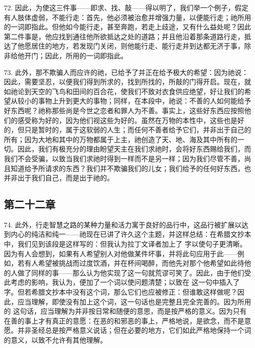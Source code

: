 72. 因此，为使这三件事——即求、找、敲——得以明了，我们举一个例子，假定有人肢体虚弱，不能行走：首先，他必须被治愈并增强力量，以便能行走；祂所用的一词即指此。但他如今能行走，甚至奔跑，若走上歧途，又有什么益处呢？因此第二件事是，他应找到通往他所欲抵达之处的道路；并且他沿着那条道路行走，抵达了他愿居住的地方，若发现门关闭，则他能行走、能行走并到达都无济于事，除非给他开门；因此，所用的一词即指此。\par

73. 此外，那不欺骗人而应许的祂，已给予了并正在给予极大的希望：因为祂说：因此，需要坚忍，以便我们得到所求的，找到所找的，所敲的门得开启。现在，就如祂论到天空的飞鸟和田间的百合花，使我们不致对衣食供应绝望，好让我们的希望从较小的事物上升到更大的事物；同样，在本段中，祂说：不善的人如何能给予好东西呢？祂称那些尚是今世之恋者和罪人为不善。事实上，这些好东西应按照他们的感受称为好的，因为他们视这些为好的。虽然在万物的本性中，这些也是好的，但只是暂时的，属于这软弱的人生；而任何不善者给予它们，并非出于自己的所有；因为大地和其中的万物都属于上主，祂创造了天、地、海及其中所有的一切。因此，我们有极充分的理由盼望天主在我们求祂时，会将好东西赐给我们，而我们不会受骗，以致当我们求祂时得到一样而不是另一样；因为我们尽管不善，尚且知道给予所请求的东西？我们并不欺骗我们的儿女；我们给予的任何好东西，也并非出于我们自己，而是出于祂的。\par


\subsection{第二十二章}

74. 此外，行走智慧之路的某种力量和活力寓于良好的品行中，这品行被扩展以达到内心的纯洁和纯一——祂现在已讲了许久这个主题，并这样总结：在希腊文抄本中，我们见到该段是这样写的：但我认为拉丁文译者加上了  字以使句子更清晰。因为有人会想到，如果有人希望别人对他做某件坏事，并将此句应用于此——例如，若有人希望被挑战而过度饮酒，并在杯间喝醉，而他先对那个他希望如此待他的人做了同样的事——那么认为他实现了这一句就荒谬可笑了。因此，由于他们受此考虑的影响，我认为，便加了一个词以使问题清楚；以致在  这一句中插入了  字。但若希腊文抄本中没有这个词，那么它们也应被修正：但谁敢这样做呢？因此，应当理解，即使没有加上这个词，这一句话也是完整且完全完善的。因为所用的  这句话，应当理解为并非按日常和随便的意思，而是按严格的意义。因为只有在善的事上才有真正的意愿：在恶的和邪恶的事上，严格地说，是欲念，而不是意愿。并非圣经总是按严格意义说话；但在必要的地方，它们如此严格地保持一个词的意义，以致不允许有其他理解。\par

